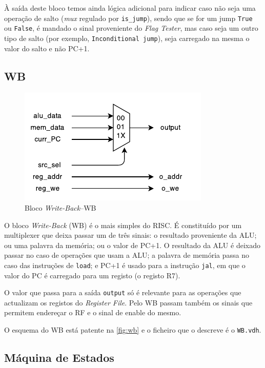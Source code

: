 \documentclass[a4paper]{article}
\begin{document}
				À saída deste bloco temos ainda lógica adicional para indicar caso não seja uma operação de salto (\textit{mux} regulado por \texttt{is\_jump}), sendo que se for um jump \texttt{True} ou \texttt{False}, é mandado o sinal proveniente do \emph{Flag Tester}, mas caso seja um outro tipo de salto (por exemplo, \texttt{Inconditional jump}), seja carregado na mesma o valor do salto e não PC+1.
			
				
		\subsection{WB}
		
			\begin{figure}[H]
				\centering
				\includegraphics[width=.8\textwidth]{img/WB}
				\caption{Bloco \textit{Write-Back}--WB}
				\label{fig:wb}
			\end{figure}
			
			O bloco \textit{Write-Back} (WB) é o mais simples do \textmu RISC. É constituído por um multiplexer que deixa passar um de três sinais: o resultado proveniente da ALU; ou uma palavra da memória; ou o valor de PC+1. O resultado da ALU é deixado passar no caso de operações que usam a ALU; a palavra de memória passa no caso das instruções de \texttt{load}; e PC+1 é usado para a instrução \texttt{jal}, em que o valor do PC é carregado para um registo (o registo R7).
			
			O valor que passa para a saída \texttt{output} só é relevante para as operações que actualizam os registos do \textit{Register File}. Pelo WB passam também os sinais que permitem endereçar o RF e o sinal de enable do mesmo.
			
			O esquema do WB está patente na \autoref{fig:wb} e o ficheiro que o descreve é o \texttt{WB.vdh}.
			

		\subsection{Máquina de Estados}
		
\end{document}
